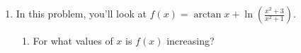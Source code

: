 \documentclass{article}
\begin{document}
\begin{enumerate}
\item \label{arctan-ln-graph}

  In this problem, you'll look at $\displaystyle f(x) = \arctan x + \ln
  \left( \frac{x^2 + 3}{x^2 + 1} \right)$.
  \begin{enumerate}
  \item \label{arctan-ln-graph-increasing}
    \begin{problem}[\vfill\vfill]
      For what values of $x$ is $f(x)$ increasing?
    \end{problem}

    \begin{solution}


\end{solution}
\end{enumerate}
\end{enumerate}
\end{document}
